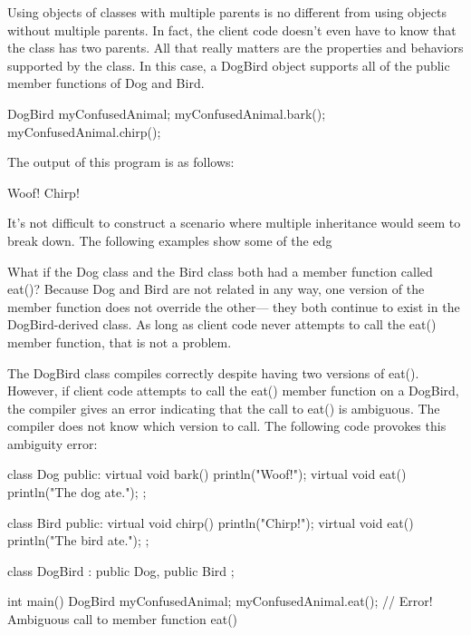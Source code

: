Using objects of classes with multiple parents is no different from using objects without multiple parents. In fact, the client code doesn’t even have to know that the class has two parents. All that really matters are the properties and behaviors supported by the class. In this case, a DogBird object supports all of the public member functions of Dog and Bird.

\begin{cpp}
DogBird myConfusedAnimal;
myConfusedAnimal.bark();
myConfusedAnimal.chirp();
\end{cpp}

The output of this program is as follows:

\begin{shell}
Woof!
Chirp!
\end{shell}


It’s not difficult to construct a scenario where multiple inheritance would seem to break down. The following examples show some of the edg


What if the Dog class and the Bird class both had a member function called eat()? Because Dog and Bird are not related in any way, one version of the member function does not override the other— they both continue to exist in the DogBird-derived class.
As long as client code never attempts to call the eat() member function, that is not a problem.

The DogBird class compiles correctly despite having two versions of eat(). However, if client code attempts to call the eat() member function on a DogBird, the compiler gives an error indicating that the call to eat() is ambiguous. The compiler does not know which version to call. The following code provokes this ambiguity error:

\begin{cpp}
class Dog
{
    public:
        virtual void bark() { println("Woof!"); }
        virtual void eat() { println("The dog ate."); }
};

class Bird
{
    public:
        virtual void chirp() { println("Chirp!"); }
        virtual void eat() { println("The bird ate."); }
};

class DogBird : public Dog, public Bird
{
};

int main()
{
    DogBird myConfusedAnimal;
    myConfusedAnimal.eat(); // Error! Ambiguous call to member function eat()
}
\end{cpp}

